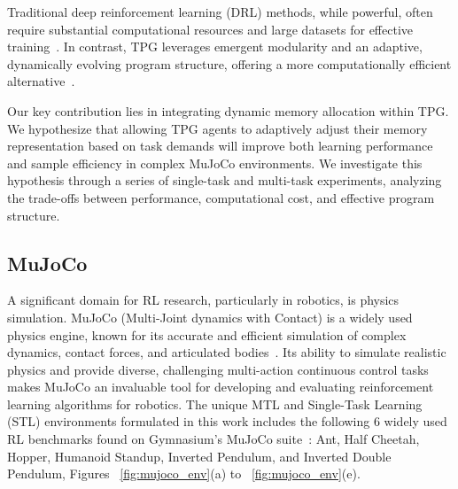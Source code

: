 \documentclass[sigconf]{acmart}
\begin{document}
Traditional deep reinforcement learning (DRL) methods, while powerful, often require substantial 
computational resources and large datasets for effective training~\cite{Mnih07}. 
In contrast, TPG leverages emergent modularity and an adaptive, dynamically evolving 
program structure, offering a more computationally efficient alternative~\cite{Kelly21}. 

Our key contribution lies in integrating dynamic memory allocation within TPG. 
We hypothesize that allowing TPG agents to adaptively adjust their memory representation 
based on task demands will improve both learning performance and sample efficiency in 
complex MuJoCo environments. We investigate this hypothesis through a series of 
single-task and multi-task experiments, analyzing the trade-offs between performance, 
computational cost, and effective program structure. 

\subsection{MuJoCo}
A significant domain for RL research, particularly in robotics, is physics 
simulation. MuJoCo (Multi-Joint dynamics with Contact) is a widely used physics 
engine, known for its accurate and efficient simulation of complex dynamics, 
contact forces, and articulated bodies~\cite{Todorov07}. Its ability to simulate realistic 
physics and provide diverse, challenging multi-action continuous control tasks makes MuJoCo an invaluable 
tool for developing and evaluating reinforcement learning algorithms for robotics. 
The unique MTL and Single-Task Learning (STL) environments formulated in this work 
includes the following 6 widely used RL benchmarks found on Gymnasium's 
MuJoCo suite~\cite{Towers07}: Ant, Half Cheetah, Hopper, Humanoid Standup, 
Inverted Pendulum, and Inverted Double Pendulum, Figures ~\ref{fig:mujoco_env}(a) to ~\ref{fig:mujoco_env}(e).
\end{document}
